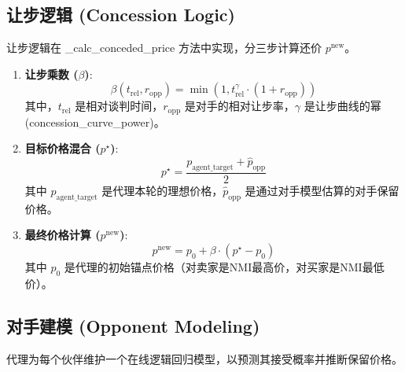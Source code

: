 \documentclass[12pt, a4paper]{article}
\begin{document}
\subsection{让步逻辑 (Concession Logic)}
让步逻辑在 \_calc\_conceded\_price 方法中实现，分三步计算还价 $p^{\text{new}}$。

\begin{enumerate}
\item \textbf{让步乘数 ($\beta$)}:%
$$
\beta(t_{\text{rel}}, r_{\text{opp}}) = \min\left(1, t_{\text{rel}}^{\gamma} \cdot (1 + r_{\text{opp}})\right)
$$
其中，$t_{\text{rel}}$ 是相对谈判时间，$r_{\text{opp}}$ 是对手的相对让步率，$\gamma$ 是让步曲线的幂 (concession\_curve\_power)。

\item \textbf{目标价格混合 ($p^{\star}$)}: %
$$
p^{\star} = \frac{p_{\text{agent\_target}} + \hat{p}_{\text{opp}}}{2}
$$
其中 $p_{\text{agent\_target}}$ 是代理本轮的理想价格，$\hat{p}_{\text{opp}}$ 是通过对手模型估算的对手保留价格。

\item \textbf{最终价格计算 ($p^{\text{new}}$)}: %
$$
p^{\text{new}} = p_0 + \beta \cdot (p^{\star} - p_0)
$$
其中 $p_0$ 是代理的初始锚点价格（对卖家是NMI最高价，对买家是NMI最低价）。

\end{enumerate}
\subsection{对手建模 (Opponent Modeling)}
代理为每个伙伴维护一个在线逻辑回归模型，以预测其接受概率并推断保留价格。
\end{document}
